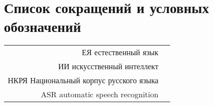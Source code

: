 \chapter*{Список сокращений и условных обозначений} %
\noindent
\begin{longtabu} to \textwidth {r X}
ЕЯ естественный язык\\
ИИ искусственный интеллект\\
НКРЯ Национальный корпус русского языка\\
ASR automatic speech recognition
\end{longtabu}
\addtocounter{table}{-1}%
